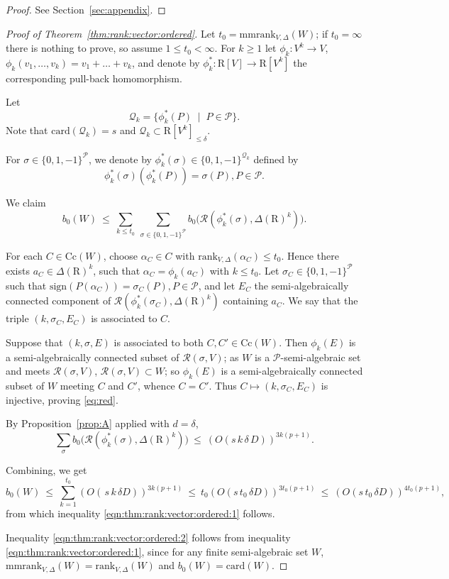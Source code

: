 \documentclass[10pt]{amsart}
\theoremstyle{definition}
\theoremstyle{remark}
\numberwithin{equation}{section}
\newcommand {\sign} {\mathrm{sign}}
\newcommand {\R} {\mathrm{R}}
\newcommand {\RR} {{\mathcal R}}
\newcommand{\card}{\mathrm{card}}
\newcommand{\rank}{\mathrm{rank}}
\newcommand{\Cc}{\mathrm{Cc}}
\newcommand{\mmrank}{\mathrm{mmrank}}
\begin{document}
\begin{proof}
    See Section~\ref{sec:appendix}.
\end{proof}
\begin{proof}[Proof of Theorem~\ref{thm:rank:vector:ordered}]
Let $t_0=\mmrank_{V,\Delta}(W)$; if $t_0=\infty$ there is nothing to prove, so assume $1\le t_0<\infty$. For $k\ge1$ let $\phi_k:V^k\to V$, $\phi_k(v_1,\dots,v_k)=v_1+\dots+v_k$,
and denote by $\phi_k^{*}: \R[V] \rightarrow \R[V^k]$ the corresponding pull-back
homomorphism.

\medskip
Let \[
\mathcal{Q}_k=\{\phi_k^{*}(P) \; \mid \; P\in\mathcal{P}\}.
\]
Note that $\card(\mathcal{Q}_k) = s$ and 
$\mathcal{Q}_k \subset\R[V^k]_{\le\delta}$. 

For $\sigma\in\{0,1,-1\}^\mathcal{P}$, we denote by 
$\phi_k^*(\sigma) \in \{0,1,-1\}^{\mathcal{Q}_k}$ defined by 
\[
\phi_k^*(\sigma)(\phi_k^*(P)) = \sigma(P), P \in \mathcal{P}.
\]

 
\smallskip
We claim
\begin{equation}\label{eq:red}
b_0(W)\ \le\ \sum_{k\le t_0}\ \sum_{\sigma\in\{0,1,-1\}^\mathcal{P}} b_0
\bigl(\RR(\phi_k^*(\sigma),\Delta(\R)^k)\bigr).
\end{equation}

For each $C\in\Cc(W)$, choose $\alpha_C\in C$ with $\mathrm{rank}_{V,\Delta}(\alpha_C) \leq  t_0$. Hence there exists $a_C \in \Delta(\R)^{k}$, such that $\alpha_C=\phi_k(a_C)$ with $k\leq t_0$.  
Let $\sigma_C \in \{0,1,-1\}^{\mathcal{P}}$
such that $\sign(P(\alpha_C)) = \sigma_C(P), P \in \mathcal{P}$,
and let $E_C$ the semi-algebraically connected component of 
$\RR(\phi_k^*(\sigma_C),\Delta(\R)^k)$ containing $a_C$. We say that
the triple $(k,\sigma_C,E_C)$ is associated to $C$.

Suppose that $(k,\sigma,E)$ is associated to both $C,C' \in \Cc(W)$.
Then $\phi_k(E)$ is a semi-algebraically connected subset of $\RR(\sigma,V)$; as $W$ is a $\mathcal{P}$-semi-algebraic set and meets $\RR(\sigma,V)$, $\RR(\sigma,V)\subset W$; so $\phi_k(E)$ is a semi-algebraically connected subset of $W$ meeting $C$ and $C'$, whence $C=C'$. Thus $C\mapsto(k,\sigma_C,E_C)$ is injective, proving \eqref{eq:red}.
 
\smallskip
By Proposition~\ref{prop:A} 
applied with $d=\delta$,
\[
\sum_{\sigma}b_0\bigl(\RR(\phi_k^*(\sigma), \Delta(\R)^k)\bigr)\ \le\ (O(s\,k\,\delta\,D))^{3k(p+1)}.
\]
 
\smallskip 
Combining, we get
\[
b_0(W)\ \le\ \sum_{k=1}^{t_0}(O(\,s\,k\,\delta D))^{3k(p+1)}\ \leq\ t_0 (O(s\,t_0\,\delta D))^{3t_0(p+1)}\ \le\ (O(s\,t_0\,\delta D))^{4t_0(p+1)},
\]
from which inequality \eqref{eqn:thm:rank:vector:ordered:1} follows.

Inequality \eqref{eqn:thm:rank:vector:ordered:2} follows from
inequality \eqref{eqn:thm:rank:vector:ordered:1}, 
since for any finite %
semi-algebraic set $W$,
$\mmrank_{V,\Delta}(W) =\rank_{V,\Delta}(W)$ and $b_0(W)=\card(W)$.
\end{proof}
\end{document}
